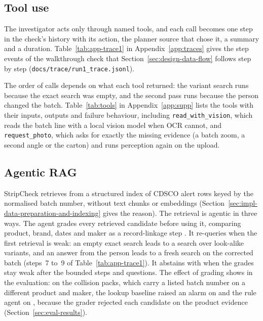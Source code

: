 \subsection{Tool use}
\label{sec:concepts-tool-use}

The investigator acts only through named tools, and each call becomes one step in the check's history with its action, the planner source that chose it, a summary and a duration. Table~\ref{tab:app-trace1} in Appendix~\ref{app:traces} gives the step events of the walkthrough check that Section~\ref{sec:design-data-flow} follows step by step (\texttt{docs/trace/run1\_trace.jsonl}).

The order of calls depends on what each tool returned: the variant search runs because the exact search was empty, and the second pass runs because the person changed the batch. Table~\ref{tab:tools} in Appendix~\ref{app:supp} lists the tools with their inputs, outputs and failure behaviour, including \texttt{read\_with\_vision}, which reads the batch line with a local vision model when OCR cannot, and \texttt{request\_photo}, which asks for exactly the missing evidence (a batch zoom, a second angle or the carton) and runs perception again on the upload.

\subsection{Agentic RAG}
\label{sec:concepts-agentic-rag}

StripCheck retrieves from a structured index of CDSCO alert rows keyed by the normalised batch number, without text chunks or embeddings (Section~\ref{sec:impl-data-preparation-and-indexing} gives the reason). The retrieval is agentic in three ways. The agent grades every retrieved candidate before using it, comparing product, brand, dates and maker as a record-linkage step \cite{fellegi1969theory,christen2012survey}. It re-queries when the first retrieval is weak: an empty exact search leads to a search over look-alike variants, and an answer from the person leads to a fresh search on the corrected batch (steps~7 to~9 of Table~\ref{tab:app-trace1}). It abstains with \CANTV{} when the grades stay weak after the bounded steps and questions. The effect of grading shows in the evaluation: on the \ResMixCollision{} collision packs, which carry a listed batch number on a different product and maker, the lookup baseline raised an alarm on \ResBaseOracleFARCollisionK{} and the rule agent on \ResRulesOracleFARCollisionK{}, because the grader rejected each candidate on the product evidence (Section~\ref{sec:eval-results}).

